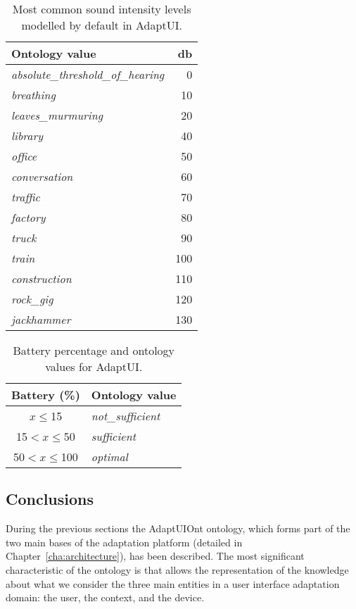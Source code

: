 \begin{table}[H]
  \caption{Most common sound intensity levels modelled by default in AdaptUI.}
 \label{tbl:sounds}
\footnotesize
\centering
 \begin{tabular}{l r}
  \hline 
  \textbf{Ontology value}	& \textbf{\ac{db}}\\
  \hline
  \textit{absolute\_threshold\_of\_hearing}& 0	\\
  \textit{breathing}		& 10 	\\
  \textit{leaves\_murmuring}	& 20	\\
  \textit{library}		& 40	\\
  \textit{office}		& 50	\\
  \textit{conversation}		& 60	\\
  \textit{traffic}		& 70	\\
  \textit{factory}		& 80	\\
  \textit{truck}		& 90	\\
  \textit{train}		& 100	\\
  \textit{construction}		& 110	\\
  \textit{rock\_gig}		& 120	\\
  \textit{jackhammer}		& 130	\\
  \hline

\end{tabular}
\end{table}


\begin{table}[H]
  \caption{Battery percentage and ontology values for AdaptUI.}
 \label{tbl:batteries}
\footnotesize
\centering
 \begin{tabular}{c l}
  \hline 
  \textbf{Battery (\%)} 	& \textbf{Ontology value}	\\
  \hline  
  $x\leq$15			& \textit{not\_sufficient}	\\
  15$<x\leq$50			& \textit{sufficient}		\\
  50$<x\leq$100			& \textit{optimal}		\\
  \hline
\end{tabular}
\end{table}


\subsection{Conclusions}
\label{sec:model_conclusions}

During the previous sections the AdaptUIOnt ontology, which forms part of the two
main bases of the adaptation platform (detailed in Chapter~\ref{cha:architecture}), 
has been described. The most significant characteristic of the ontology is that
allows the representation of the knowledge about what we consider the three main
entities in a user interface adaptation domain: the user, the context, and the device. 


